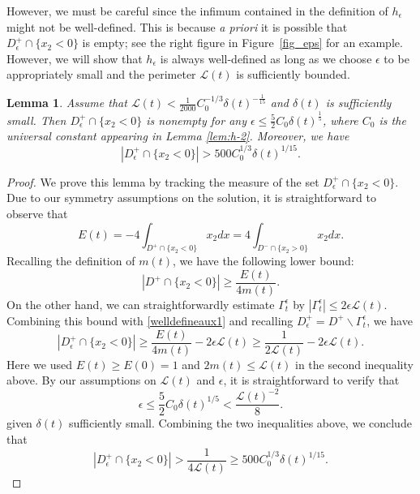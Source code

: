 \documentclass[11pt]{article}
\numberwithin{equation}{section}
\newtheorem{lem}[thm]{Lemma}
\newcommand{\eps}{\epsilon}
\newcommand{\calL}{\mathcal{L}}
\begin{document}
However, we must be careful since the infimum contained in the definition of $h_\eps$ might not be well-defined. This is because \textit{a priori} it is possible that $D_\eps^+ \cap \{x_2 < 0\}$ is empty; see the right figure in Figure~\ref{fig_eps} for an example. However, we will show that $h_\eps$ is always well-defined as long as we choose $\eps$ to be appropriately small and the perimeter $\calL(t)$ is sufficiently bounded.

\begin{lem}\label{lem:h(t)}
    Assume that $\calL(t) < \frac{1}{2000}C_0^{-1/3}\delta(t)^{-\frac{1}{15}}$ and $\delta(t)$ is sufficiently small. Then $D_\eps^+ \cap \{x_2 < 0\}$ is nonempty for any $\eps \le {\frac52} C_0\delta(t)^{\frac15}$, where $C_0$ is the universal constant appearing in Lemma \ref{lem:h-2}. Moreover, we have
    \begin{equation}
        \label{est:Depslb}
        |D_\eps^+ \cap \{x_2 < 0\}| > 500C_0^{1/3}\delta(t)^{1/15}.
    \end{equation}
\end{lem}

\begin{proof}
    We prove this lemma by tracking the measure of the set $D_\eps^+ \cap \{x_2 < 0\}$. Due to our symmetry assumptions on the solution, it is straightforward to observe that
    $$
    E(t) = -4\int_{D^+ \cap \{x_2 < 0\}} x_2 dx = 4\int_{D^- \cap \{x_2 > 0\}} x_2 dx.
    $$
    Recalling the definition of $m(t)$, we have the following lower bound:
    \begin{equation}\label{welldefineaux1}
    |D^+ \cap \{x_2 < 0\}| \ge \frac{E(t)}{4m(t)}.
    \end{equation}
    On the other hand, we can straightforwardly estimate $\Gamma_t^\eps$ by $|\Gamma_t^\eps| \le 2\eps \calL(t)$. Combining this bound with \eqref{welldefineaux1} and recalling $D_\eps^+ = D^+\backslash \Gamma_t^\eps$, we have
    $$
    |D_\eps^+ \cap \{x_2 < 0\}| \ge \frac{E(t)}{4m(t)} - 2\eps \calL(t) \ge \frac{1}{2\calL(t)} - 2\eps\calL(t).
    $$
    Here we used $E(t) \ge E(0) = 1$ and $2m(t) \le \calL(t)$ in the second inequality above. By our assumptions on $\calL(t)$ and $\eps$, it is straightforward to verify that
    $$
    \eps \le {\frac52}C_0\delta(t)^{1/5} < \frac{\calL(t)^{-2}}{8}.
    $$
    given $\delta(t)$ sufficiently small. Combining the two inequalities above, we conclude that $$|D_\eps^+ \cap \{x_2 < 0\}| > \frac{1}{4\calL(t)} \ge 500C_0^{1/3}\delta(t)^{1/15}.$$
\end{proof}
\end{document}
